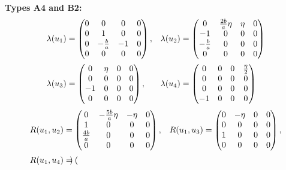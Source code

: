 \documentclass{amsart}
\theoremstyle{plain}
\theoremstyle{remark}
\begin{document}
{\smallskip\noindent
{\bf Types A4 and B2:}
{\small \begin{equation}\label{lambdaA4}
\begin{array}{ll}
\lambda(u_1) = \begin{pmatrix}
0 & 0 & 0 & 0\\
0 & 1 & 0 & 0\\
0 & -\frac{b}{a} & -1 & 0\\
0 & 0 & 0 & 0
\end{pmatrix}, &
\lambda(u_2) = \begin{pmatrix}
0 & \frac{2b}{a}\eta & \eta & 0\\
-1 & 0 & 0 & 0\\
-\frac{b}{a} & 0 & 0 & 0\\
0 & 0 & 0 & 0
\end{pmatrix} \vspace{2mm}
\\
\lambda(u_3) = \begin{pmatrix}
0 & \eta & 0 & 0\\
0 & 0 & 0 & 0\\
-1 & 0 & 0 & 0\\
0 & 0 & 0 & 0
\end{pmatrix}, &
\lambda(u_4) = \begin{pmatrix}
0 & 0 & 0 & \frac{\eta}{2}\\
0 & 0 & 0 & 0\\
0 & 0 & 0 & 0\\
-1 & 0 & 0 & 0
\end{pmatrix}
\end{array}
\end{equation}
\begin{equation}\label{RA4}
\begin{array}{ll}
R(u_1,u_2) = \begin{pmatrix}
0 & -\frac{5b}{a}\eta & -\eta & 0\\
1 & 0 & 0 & 0\\
\frac{4b}{a} & 0 & 0 & 0\\
0 & 0 & 0 & 0
\end{pmatrix}, &
R(u_1,u_3) = \begin{pmatrix}
0 & -\eta & 0 & 0\\
0 & 0 & 0 & 0\\
1 & 0 & 0 & 0\\
0 & 0 & 0 & 0
\end{pmatrix}, \vspace{2mm} \\ 
R(u_1,u_4) = \begin{pmatrix}

\end{pmatrix}
\end{array}
\end{equation}}}
\end{document}
